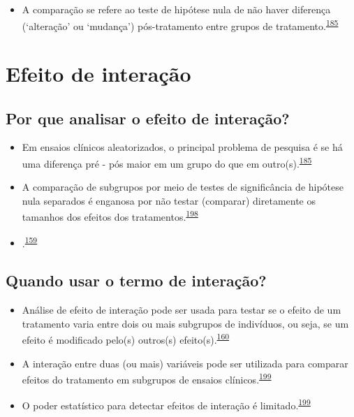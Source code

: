 \documentclass[
  a4paper,
]{book}
\providecommand{\tightlist}{%
  \setlength{\itemsep}{0pt}\setlength{\parskip}{0pt}}
\begin{document}
\begin{itemize}
\tightlist
\item
  A comparação se refere ao teste de hipótese nula de não haver diferença (`alteração' ou `mudança') pós-tratamento entre grupos de tratamento.\textsuperscript{\protect\hyperlink{ref-bland2011}{185}}
\end{itemize}

\hypertarget{interacao}{%
\section{Efeito de interação}\label{interacao}}

\hypertarget{por-que-analisar-o-efeito-de-interauxe7uxe3o}{%
\subsection{Por que analisar o efeito de interação?}\label{por-que-analisar-o-efeito-de-interauxe7uxe3o}}

\begin{itemize}
\item
  Em ensaios clínicos aleatorizados, o principal problema de pesquisa é se há uma diferença pré - pós maior em um grupo do que em outro(s).\textsuperscript{\protect\hyperlink{ref-bland2011}{185}}
\item
  A comparação de subgrupos por meio de testes de significância de hipótese nula separados é enganosa por não testar (comparar) diretamente os tamanhos dos efeitos dos tratamentos.\textsuperscript{\protect\hyperlink{ref-Matthews1996}{198}}
\item
  .\textsuperscript{\protect\hyperlink{ref-Bours2023}{159}}
\end{itemize}

\hypertarget{quando-usar-o-termo-de-interauxe7uxe3o}{%
\subsection{Quando usar o termo de interação?}\label{quando-usar-o-termo-de-interauxe7uxe3o}}

\begin{itemize}
\item
  Análise de efeito de interação pode ser usada para testar se o efeito de um tratamento varia entre dois ou mais subgrupos de indivíduos, ou seja, se um efeito é modificado pelo(s) outros(s) efeito(s).\textsuperscript{\protect\hyperlink{ref-Altman1996}{160}}
\item
  A interação entre duas (ou mais) variáveis pode ser utilizada para comparar efeitos do tratamento em subgrupos de ensaios clínicos.\textsuperscript{\protect\hyperlink{ref-Altman2003}{199}}
\item
  O poder estatístico para detectar efeitos de interação é limitado.\textsuperscript{\protect\hyperlink{ref-Altman2003}{199}}
\end{itemize}
\end{document}
